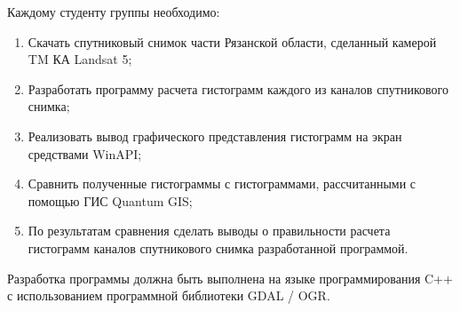 
Каждому студенту группы необходимо:

\begin{enumerate}

	\item Скачать спутниковый снимок части Рязанской области, сделанный камерой TM КА Landsat 5;
	\item Разработать программу расчета гистограмм каждого из каналов спутникового снимка;
	\item Реализовать вывод графического представления гистограмм на экран средствами \linebreak WinAPI;
	\item Сравнить полученные гистограммы с гистограммами, рассчитанными с помощью ГИС Quantum GIS;
	\item По результатам сравнения сделать выводы о правильности расчета гистограмм каналов спутникового снимка разработанной программой.

\end{enumerate}
	
Разработка программы должна быть выполнена на языке программирования C++ с использованием программной библиотеки GDAL / OGR.

